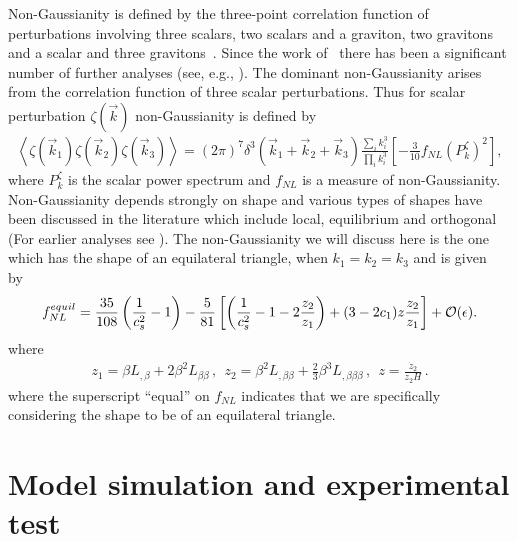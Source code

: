 \documentclass[a4paper,11pt]{article}
\begin{document}

  Non-Gaussianity is defined by the three-point correlation function of perturbations involving
  three scalars, two scalars and a graviton, two gravitons and a scalar and three gravitons~\cite{Maldacena:2002vr}.
  Since the work of~\cite{Maldacena:2002vr}  there has been
  a significant number of further analyses (see, e.g., \cite{Acquaviva:2002ud,Creminelli:2003iq,
  Silverstein:2003hf,Gruzinov:2004jx,Alishahiha:2004eh,Chen:2005fe,Creminelli:2005hu,
  Seery:2005wm,Babich:2004gb,Lyth:2005fi,Chen:2006nt, Huang:2007hh,Langlois:2008wt}).
  The dominant non-Gaussianity
  arises from the correlation function of three scalar perturbations. Thus for scalar perturbation $\zeta(\vec k)$ non-Gaussianity
  is defined by
  \begin{align}
    \left< \zeta(\vec k_1) \zeta(\vec k_2) \zeta(\vec k_3) \right> = (2\pi)^7 \delta^3(\vec k_1+ \vec k_2+ \vec k_3) \frac{\sum_i k_i^3}{\prod_i k_i^3}
    \left[ -\frac{3}{10} f_{NL} (P_k^{\zeta})^2 \right],
  \end{align}
  where $P_k^{\zeta}$ is the scalar power spectrum and $f_{NL}$ is a measure of non-Gaussianity. 
  Non-Gaussianity depends strongly on  shape and various types of shapes have been discussed in the 
literature which include local, equilibrium and orthogonal ~\cite{Ade:2015ava} (For earlier analyses see 
\cite{Komatsu:2001rj,Komatsu:2003fd,Verde:1999ij}).
 The non-Gaussianity  we will discuss here is the one which has the shape of an equilateral triangle, 
  when $k_1=k_2=k_3$ and  is given by~\cite{Chen:2006nt}
  \begin{align}
   f^{equil}_{NL}= \frac{35}{108}\left(\frac{1}{c_s^2}-1\right) - \frac{5}{81} \left[ \left(\frac{1}{c_s^2} -1- 2\frac{z_2}{z_1}\right) + (3-2 {c}_1)z \frac{z_2}{z_1}\right] + {\cal O}(\epsilon).
    \label{equil}
  \end{align}
  where
  \begin{align}
    z_1= \beta L_{,\beta} + 2 \beta^2 L_{\beta\beta}\,,~~
    z_2= \beta^2 L_{,\beta \beta} + \frac{2}{3} \beta^3 L_{,\beta\beta\beta}\,,~~
    z= \frac{\dot z_2}{z_2 H}\,.
  \end{align}
 where the superscript ``equal''  on $f_{NL}$ indicates that we are specifically considering the shape to be of an equilateral 
 triangle.
  
\section{Model simulation and experimental test \label{sec6}}
\end{document}
